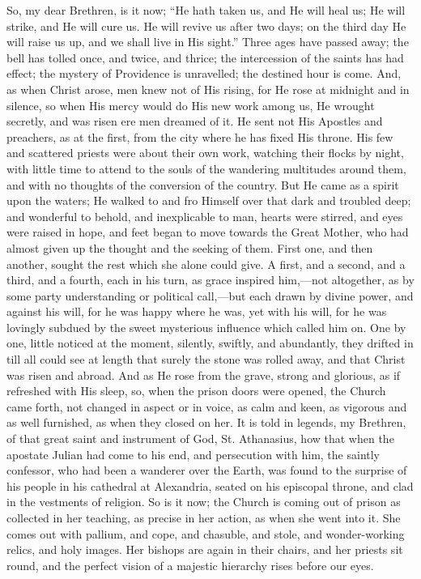 So, my dear Brethren, is it now; ``He hath taken
us, and He will heal us; He will strike, and He will cure
us. He will revive us after two days; on the third day He
will raise us up, and we shall live in His sight.''
Three ages have passed away; the bell has tolled once,
and twice, and thrice; the intercession of the saints has
had effect; the mystery of Providence is unravelled; the
destined hour is come. And, as when Christ arose, men
knew not of His rising, for He rose at midnight and in
silence, so when His mercy would do His new work among
us, He wrought secretly, and was risen ere men dreamed of
it. He sent not His Apostles and preachers, as at the
first, from the city where he has fixed His throne. His
few and scattered priests were about their own work,
watching their flocks by night, with little time to
attend to the souls of the wandering multitudes around
them, and with no thoughts of the conversion of the
country. But He came as a spirit upon the waters; He
walked to and fro Himself over that dark and troubled
deep; and wonderful to behold, and inexplicable to man,
hearts were stirred, and eyes were raised in hope, and
feet began to move towards the Great Mother, who had
almost given up the thought and the seeking of them.
First one, and then another, sought the rest which she
alone could give. A first, and a second, and a third, and
a fourth, each in his turn, as grace inspired
him,—not altogether, as by some party understanding
or political call,—but each drawn by divine power,
and against his will, for he was happy where he was, yet
with his will, for he was lovingly subdued by the sweet
mysterious influence which called him on. One by one,
little noticed at the moment, silently, swiftly, and
abundantly, they drifted in till all could see at length
that surely the stone was rolled away, and that Christ
was risen and abroad. And as He rose from the grave,
strong and glorious, as if refreshed with His sleep, so,
when the prison doors were opened, the Church came forth,
not changed in aspect or in voice, as calm and keen, as
vigorous and as well furnished, as when they closed on
her. It is told in legends, my Brethren, of that great
saint and instrument of God, St. Athanasius, how that
when the apostate Julian had come to his end, and
persecution with him, the saintly confessor, who had been
a wanderer over the Earth, was found to the surprise of
his people in his cathedral at Alexandria, seated on his
episcopal throne, and clad in the vestments of religion.
So is it now; the Church is coming out of prison as
collected in her teaching, as precise in her action, as
when she went into it. She comes out with pallium, and
cope, and chasuble, and stole, and wonder-working relics,
and holy images. Her bishops are again in their chairs,
and her priests sit round, and the perfect vision of a
majestic hierarchy rises before our eyes.

